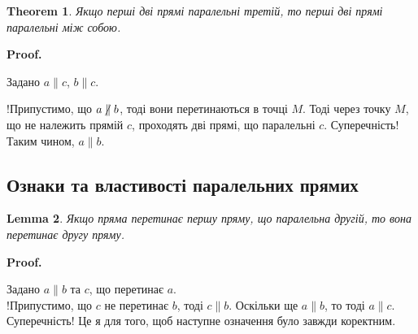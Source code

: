 \documentclass[a4paper, 10pt]{article}
\makeatletter
\theoremstyle{theoremdd}
\newtheorem{theorem}{Theorem}[subsection]
\theoremstyle{theoremdd}
\theoremstyle{theoremdd}
\theoremstyle{theoremdd}
\theoremstyle{theoremdd}
\theoremstyle{theoremdd}
\theoremstyle{theoremdd}
\theoremstyle{theoremdd}
\newtheorem{lemma}[theorem]{Lemma}
\theoremstyle{theoremdd}
\renewenvironment{proof}[1][Proof.\\]{\par
\pushQED{\hfill \qed}%
\normalfont \topsep6\p@\@plus6\p@\relax
\trivlist
\item\relax
{\bfseries
#1\@addpunct{.}}\hspace\labelsep\ignorespaces
}{%
\popQED\endtrivlist\@endpefalse
}
\makeatother
\begin{document}
\begin{theorem}
Якщо перші дві прямі паралельні третій, то перші дві прямі паралельні між собою.
\end{theorem}

\begin{proof}
Задано $a \parallel c$, $b \parallel c$.\\
\begin{figure}[H]
\centering
{}
\end{figure}
!Припустимо, що $a \centernot\parallel b$, тоді вони перетинаються в точці $M$. Тоді через точку $M$, що не належить прямій $c$, проходять дві прямі, що паралельні $c$. Суперечність!\\
Таким чином, $a \parallel b$.
\end{proof}

\subsection{Ознаки та властивості паралельних прямих}
\begin{lemma}
Якщо пряма перетинає першу пряму, що паралельна другій, то вона перетинає другу пряму.
\end{lemma}

\begin{proof}
Задано $a \parallel b$ та $c$, що перетинає $a$.\\
!Припустимо, що $c$ не перетинає $b$, тоді $c \parallel b$. Оскільки ще $a \parallel b$, то тоді $a \parallel c$. Суперечність!
\end{proof}
Це я для того, щоб наступне означення було завжди коректним.
\end{document}
